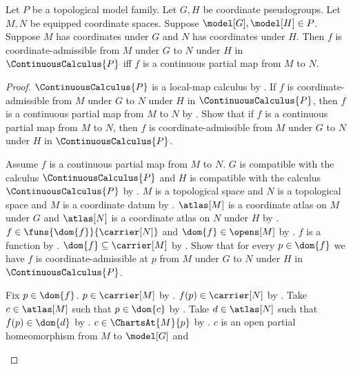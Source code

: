 \begin{theorem}\label{continuous_calculus_coordinate_maps}
    Let $P$ be a topological model family.
    Let $G,H$ be coordinate pseudogroups.
    Let $M,N$ be equipped coordinate spaces.
    Suppose $\model[G],\model[H]\in P$.
    Suppose $M$ has coordinates under $G$ and $N$ has coordinates under $H$.
    Then $f$ is coordinate-admissible from $M$ under $G$ to $N$ under $H$ in $\ContinuousCalculus{P}$ iff
        $f$ is a continuous partial map from $M$ to $N$.
\end{theorem}
\begin{proof}
    $\ContinuousCalculus{P}$ is a local-map calculus by .
    If $f$ is coordinate-admissible from $M$ under $G$ to $N$ under $H$ in $\ContinuousCalculus{P}$,
        then $f$ is a continuous partial map from $M$ to $N$ by
        .
    Show that if $f$ is a continuous partial map from $M$ to $N$, then
        $f$ is coordinate-admissible from $M$ under $G$ to $N$ under $H$ in $\ContinuousCalculus{P}$.
    \begin{subproof}
        Assume $f$ is a continuous partial map from $M$ to $N$.
        $G$ is compatible with the calculus $\ContinuousCalculus{P}$ and
            $H$ is compatible with the calculus $\ContinuousCalculus{P}$ by
            .
        $M$ is a topological space and $N$ is a topological space and
            $M$ is a coordinate datum by .
        $\atlas[M]$ is a coordinate atlas on $M$ under $G$ and
            $\atlas[N]$ is a coordinate atlas on $N$ under $H$ by .
        $f\in\funs{\dom{f}}{\carrier[N]}$ and $\dom{f}\in\opens[M]$ by
            .
        $f$ is a function by .
        $\dom{f}\subseteq\carrier[M]$ by .
        Show that for every $p\in\dom{f}$ we have
            $f$ is coordinate-admissible at $p$ from $M$ under $G$ to $N$ under $H$ in $\ContinuousCalculus{P}$.
        \begin{subproof}
            Fix $p\in\dom{f}$.
            $p\in\carrier[M]$ by .
            $f(p)\in\carrier[N]$ by .
            Take $c\in\atlas[M]$ such that $p\in\dom{c}$ by .
            Take $d\in\atlas[N]$ such that $f(p)\in\dom{d}$ by .
            $c\in\ChartsAt{M}{p}$ by .
            $c$ is an open partial homeomorphism from $M$ to $\model[G]$ and

\end{subproof}
\end{subproof}
\end{proof}
